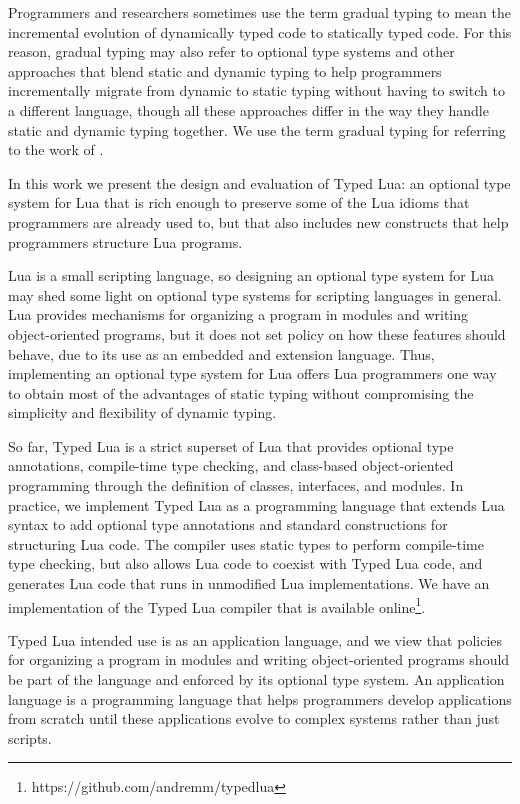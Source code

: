Programmers and researchers sometimes use the term gradual typing
to mean the incremental evolution of dynamically typed code to
statically typed code.
For this reason, gradual typing may also refer to optional type
systems and other approaches that blend static and dynamic typing to
help programmers incrementally migrate from dynamic to static typing
without having to switch to a different language, though all these
approaches differ in the way they handle static and dynamic typing
together.
We use the term gradual typing for referring to the work of
\citet{siek2006gradual}.

In this work we present the design and evaluation of Typed Lua:
an optional type system for Lua that is rich enough to
preserve some of the Lua idioms that programmers are already used to,
but that also includes new constructs that help programmers
structure Lua programs.

Lua is a small scripting language, so designing an optional type
system for Lua may shed some light on optional type systems for
scripting languages in general.
Lua provides mechanisms for organizing a program in modules and
writing object-oriented programs, but it does not set policy on how
these features should behave, due to its use as an embedded and
extension language.
Thus, implementing an optional type system for Lua offers Lua
programmers one way to obtain most of the advantages of static typing
without compromising the simplicity and flexibility of dynamic typing.

So far, Typed Lua is a strict superset of Lua that
provides optional type annotations, compile-time type checking, and
class-based object-oriented programming through the definition of
classes, interfaces, and modules.
In practice, we implement Typed Lua as a programming language that
extends Lua syntax to add optional type annotations and standard
constructions for structuring Lua code.
The compiler uses static types to perform compile-time type
checking, but also allows Lua code to coexist with Typed Lua code,
and generates Lua code that runs in unmodified Lua implementations.
We have an implementation of the Typed Lua compiler that is
available online\footnote{https://github.com/andremm/typedlua}.

Typed Lua intended use is as an application language, and we view
that policies for organizing a program in modules and writing
object-oriented programs should be part of the language and
enforced by its optional type system.
An application language is a programming language that helps
programmers develop applications from scratch until these
applications evolve to complex systems rather than just scripts.

